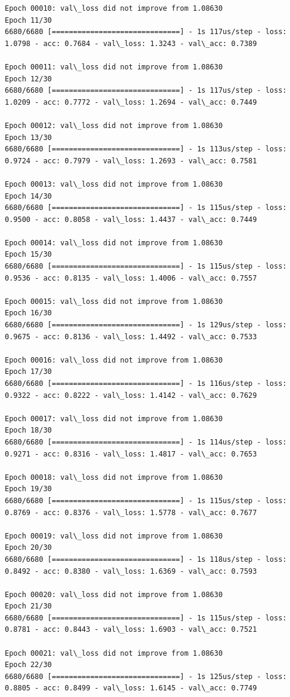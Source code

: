 \documentclass[11pt]{article}
\begin{document}
\begin{Verbatim}[commandchars=\\\{\}]
Epoch 00010: val\_loss did not improve from 1.08630
Epoch 11/30
6680/6680 [==============================] - 1s 117us/step - loss: 1.0798 - acc: 0.7684 - val\_loss: 1.3243 - val\_acc: 0.7389

Epoch 00011: val\_loss did not improve from 1.08630
Epoch 12/30
6680/6680 [==============================] - 1s 117us/step - loss: 1.0209 - acc: 0.7772 - val\_loss: 1.2694 - val\_acc: 0.7449

Epoch 00012: val\_loss did not improve from 1.08630
Epoch 13/30
6680/6680 [==============================] - 1s 113us/step - loss: 0.9724 - acc: 0.7979 - val\_loss: 1.2693 - val\_acc: 0.7581

Epoch 00013: val\_loss did not improve from 1.08630
Epoch 14/30
6680/6680 [==============================] - 1s 115us/step - loss: 0.9500 - acc: 0.8058 - val\_loss: 1.4437 - val\_acc: 0.7449

Epoch 00014: val\_loss did not improve from 1.08630
Epoch 15/30
6680/6680 [==============================] - 1s 115us/step - loss: 0.9536 - acc: 0.8135 - val\_loss: 1.4006 - val\_acc: 0.7557

Epoch 00015: val\_loss did not improve from 1.08630
Epoch 16/30
6680/6680 [==============================] - 1s 129us/step - loss: 0.9675 - acc: 0.8136 - val\_loss: 1.4492 - val\_acc: 0.7533

Epoch 00016: val\_loss did not improve from 1.08630
Epoch 17/30
6680/6680 [==============================] - 1s 116us/step - loss: 0.9322 - acc: 0.8222 - val\_loss: 1.4142 - val\_acc: 0.7629

Epoch 00017: val\_loss did not improve from 1.08630
Epoch 18/30
6680/6680 [==============================] - 1s 114us/step - loss: 0.9271 - acc: 0.8316 - val\_loss: 1.4817 - val\_acc: 0.7653

Epoch 00018: val\_loss did not improve from 1.08630
Epoch 19/30
6680/6680 [==============================] - 1s 115us/step - loss: 0.8769 - acc: 0.8376 - val\_loss: 1.5778 - val\_acc: 0.7677

Epoch 00019: val\_loss did not improve from 1.08630
Epoch 20/30
6680/6680 [==============================] - 1s 118us/step - loss: 0.8492 - acc: 0.8380 - val\_loss: 1.6369 - val\_acc: 0.7593

Epoch 00020: val\_loss did not improve from 1.08630
Epoch 21/30
6680/6680 [==============================] - 1s 115us/step - loss: 0.8781 - acc: 0.8443 - val\_loss: 1.6903 - val\_acc: 0.7521

Epoch 00021: val\_loss did not improve from 1.08630
Epoch 22/30
6680/6680 [==============================] - 1s 125us/step - loss: 0.8805 - acc: 0.8499 - val\_loss: 1.6145 - val\_acc: 0.7749


\end{Verbatim}
\end{document}

